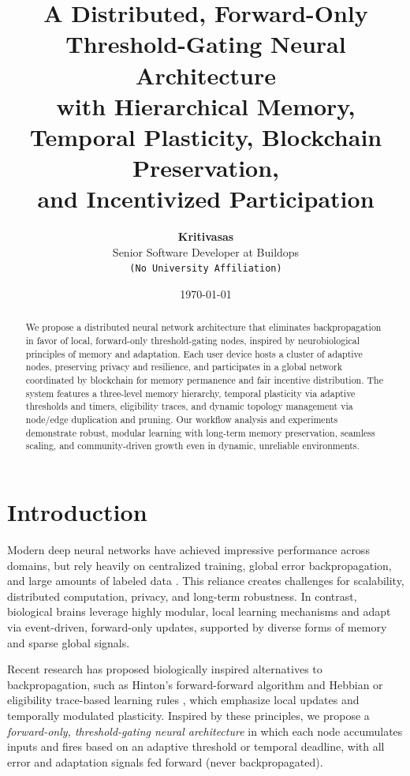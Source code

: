 \documentclass[11pt]{article}
\title{A Distributed, Forward-Only Threshold-Gating Neural Architecture\\
with Hierarchical Memory, Temporal Plasticity, Blockchain Preservation,\\
and Incentivized Participation}
\author{
  \textbf{Kritivasas} \\
  \small Senior Software Developer at Buildops \\
  \small \texttt{(No University Affiliation)}
}
\date{\today}
\begin{document}
\maketitle

\begin{abstract}
We propose a distributed neural network architecture that eliminates backpropagation in favor of local, forward-only threshold-gating nodes, inspired by neurobiological principles of memory and adaptation. Each user device hosts a cluster of adaptive nodes, preserving privacy and resilience, and participates in a global network coordinated by blockchain for memory permanence and fair incentive distribution. The system features a three-level memory hierarchy, temporal plasticity via adaptive thresholds and timers, eligibility traces, and dynamic topology management via node/edge duplication and pruning. Our workflow analysis and experiments demonstrate robust, modular learning with long-term memory preservation, seamless scaling, and community-driven growth even in dynamic, unreliable environments.
\end{abstract}

\section{Introduction}
Modern deep neural networks have achieved impressive performance across domains, but rely heavily on centralized training, global error backpropagation, and large amounts of labeled data \cite{Rumelhart1986,LeCun2015}. This reliance creates challenges for scalability, distributed computation, privacy, and long-term robustness. In contrast, biological brains leverage highly modular, local learning mechanisms and adapt via event-driven, forward-only updates, supported by diverse forms of memory and sparse global signals.

Recent research has proposed biologically inspired alternatives to backpropagation, such as Hinton's forward-forward algorithm \cite{Hinton2022} and Hebbian or eligibility trace-based learning rules \cite{Hebb1949, Gerstner2018}, which emphasize local updates and temporally modulated plasticity. Inspired by these principles, we propose a \emph{forward-only, threshold-gating neural architecture} in which each node accumulates inputs and fires based on an adaptive threshold or temporal deadline, with all error and adaptation signals fed forward (never backpropagated).
\end{document}
